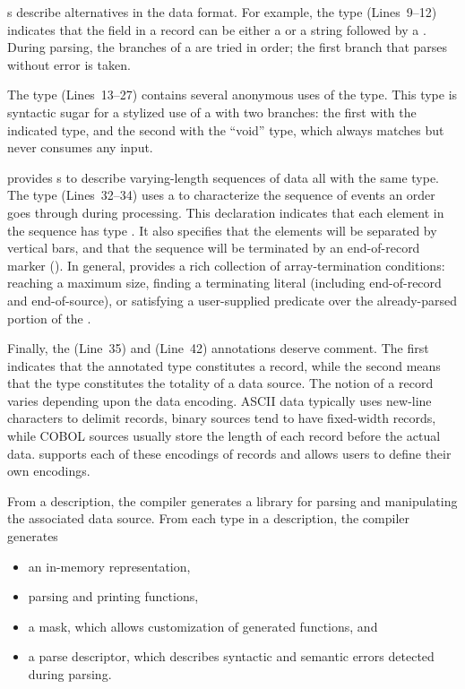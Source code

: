 s describe alternatives in the data format.  For example,
the  type (Lines~9--12) indicates
that the  field in a \dibbler{} record can be either a
 or a string  followed by a .
During parsing, the branches of a  are tried in order; the
first branch that parses without error is taken.  

The  type (Lines~13--27) contains several anonymous uses of the
 type.  This type is syntactic sugar for a stylized use of a
 with two branches: the first with the indicated type, and
the second with the ``void'' type, which always matches but never
consumes any input.

\pads{} provides s to describe varying-length sequences of
data all with the same type.  The  type (Lines~32--34) uses a
 to characterize the sequence of events an order goes
through during processing.  This declaration indicates that each
element in the sequence has type .  It also specifies
that the elements will be separated by vertical bars, and that the
sequence will be terminated by an end-of-record marker ().
In general, \pads{} provides a rich collection of array-termination
conditions: reaching a maximum size, finding a terminating literal
(including end-of-record and end-of-source), or satisfying a
user-supplied predicate over the already-parsed portion of the
.

Finally, the  (Line~35) and  (Line~42) annotations deserve comment.  The first
indicates that the annotated type constitutes a record,
while the second means that the type constitutes the totality of a data source.  
The notion of a record varies depending upon the data encoding.  
ASCII data typically uses new-line characters to delimit 
records, binary sources tend to have fixed-width records, while 
COBOL sources usually store the length of each record before the actual data.
\pads{} supports each of these encodings of records and allows users to define
their own encodings.  

From a description, the \pads{} compiler generates a \C{} library
for parsing and manipulating the associated data source.  
From each type in a \pads{} description, the compiler generates
\begin{itemize}
\setlength{\itemsep}{0ex plus0.2ex}
\item an in-memory representation, 
\item parsing and printing functions, 
\item a mask, which allows customization of generated functions, and
\item a parse descriptor, which describes syntactic and semantic errors detected during parsing.
\end{itemize}

